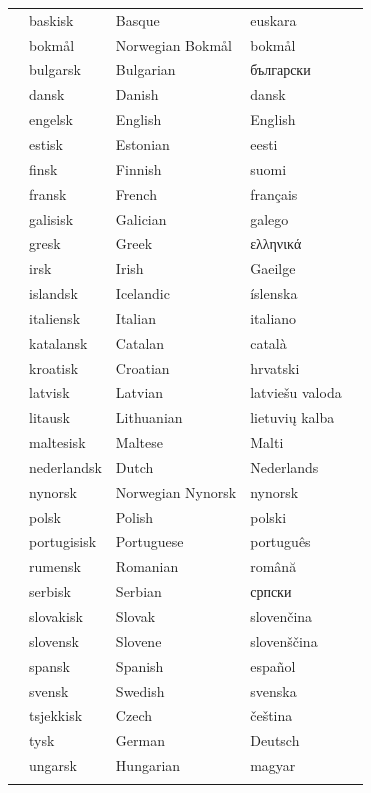 \cleardoublepage

\label{whitepaperseries}

\vspace*{-5mm}
\centering
  \setlength{\tabcolsep}{2.6em}
  \begin{tabularx}{\textwidth}{lllll} \toprule\addlinespace
  &baskisk & Basque & euskara& \\
  &bokmål & Norwegian Bokmål & bokmål& \\
  &bulgarsk & Bulgarian & български& \\
  &dansk & Danish & dansk& \\
  &engelsk & English & English& \\
  &estisk & Estonian & eesti& \\
  &finsk & Finnish & suomi& \\
  &fransk & French & français& \\
  &galisisk & Galician & galego& \\
  &gresk & Greek & ελληνικά& \\
  &irsk & Irish & Gaeilge& \\
  &islandsk & Icelandic & íslenska& \\
  &italiensk & Italian & italiano& \\
  &katalansk & Catalan & català& \\
  &kroatisk & Croatian & hrvatski& \\
  &latvisk & Latvian & latviešu valoda& \\
  &litausk & Lithuanian & lietuvių kalba& \\
  &maltesisk & Maltese & Malti& \\
  &nederlandsk & Dutch & Nederlands& \\
  &nynorsk & Norwegian Nynorsk & nynorsk& \\
  &polsk & Polish & polski& \\
  &portugisisk & Portuguese & português& \\
  &rumensk & Romanian & română& \\
  &serbisk & Serbian & српски& \\
  &slovakisk & Slovak & slovenčina& \\
  &slovensk & Slovene & slovenščina& \\
  &spansk & Spanish & español& \\
  &svensk & Swedish & svenska& \\
  &tsjekkisk & Czech & čeština& \\
  &tysk & German & Deutsch& \\
  &ungarsk & Hungarian & magyar& \\ \addlinespace \bottomrule
\end{tabularx}
